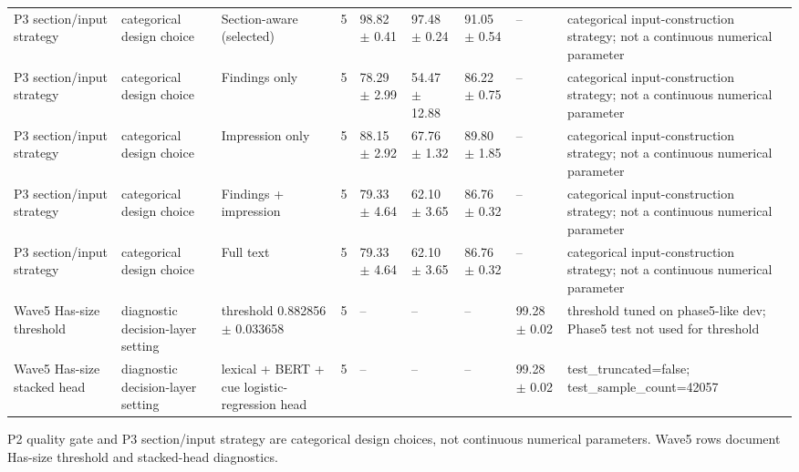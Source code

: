 \begin{table}[t]
{\begin{tabular}{lllllllll}
P3 section/input strategy & categorical design choice & Section-aware (selected) & 5 & 98.82 $\pm$ 0.41 & 97.48 $\pm$ 0.24 & 91.05 $\pm$ 0.54 & -- & categorical input-construction strategy; not a continuous numerical parameter \\
P3 section/input strategy & categorical design choice & Findings only & 5 & 78.29 $\pm$ 2.99 & 54.47 $\pm$ 12.88 & 86.22 $\pm$ 0.75 & -- & categorical input-construction strategy; not a continuous numerical parameter \\
P3 section/input strategy & categorical design choice & Impression only & 5 & 88.15 $\pm$ 2.92 & 67.76 $\pm$ 1.32 & 89.80 $\pm$ 1.85 & -- & categorical input-construction strategy; not a continuous numerical parameter \\
P3 section/input strategy & categorical design choice & Findings + impression & 5 & 79.33 $\pm$ 4.64 & 62.10 $\pm$ 3.65 & 86.76 $\pm$ 0.32 & -- & categorical input-construction strategy; not a continuous numerical parameter \\
P3 section/input strategy & categorical design choice & Full text & 5 & 79.33 $\pm$ 4.64 & 62.10 $\pm$ 3.65 & 86.76 $\pm$ 0.32 & -- & categorical input-construction strategy; not a continuous numerical parameter \\
Wave5 Has-size threshold & diagnostic decision-layer setting & threshold 0.882856 $\pm$ 0.033658 & 5 & -- & -- & -- & 99.28 $\pm$ 0.02 & threshold tuned on phase5-like dev; Phase5 test not used for threshold \\
Wave5 Has-size stacked head & diagnostic decision-layer setting & lexical + BERT + cue logistic-regression head & 5 & -- & -- & -- & 99.28 $\pm$ 0.02 & test\_truncated=false; test\_sample\_count=42057 \\
\bottomrule
\end{tabular}%
}
\vspace{0.3em}
\footnotesize{P2 quality gate and P3 section/input strategy are categorical design choices, not continuous numerical parameters. Wave5 rows document Has-size threshold and stacked-head diagnostics.}
\end{table}

